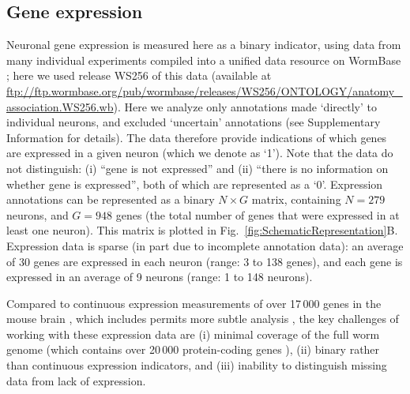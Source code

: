 \documentclass[10pt,letterpaper]{article}
\begin{document}
\subsection*{Gene expression}
Neuronal gene expression is measured here as a binary indicator, using data from many individual experiments compiled into a unified data resource on WormBase \cite{Harris:2009kd}; here we used release WS256 of this data (available at \url{ftp://ftp.wormbase.org/pub/wormbase/releases/WS256/ONTOLOGY/anatomy_association.WS256.wb}).
Here we analyze only annotations made `directly' to individual neurons, and excluded `uncertain' annotations (see Supplementary Information for details).
The data therefore provide indications of which genes are expressed in a given neuron (which we denote as `1').
Note that the data do not distinguish: (i) ``gene is not expressed'' and (ii) ``there is no information on whether gene is expressed'', both of which are represented as a `0'.
Expression annotations can be represented as a binary $N \times G$ matrix, containing $N=279$ neurons, and $G = 948$ genes (the total number of genes that were expressed in at least one neuron).
This matrix is plotted in Fig.~\ref{fig:SchematicRepresentation}B.
Expression data is sparse (in part due to incomplete annotation data): an average of 30 genes are expressed in each neuron (range: 3 to 138 genes), and each gene is expressed in an average of 9 neurons (range: 1 to 148 neurons).

Compared to continuous expression measurements of over 17\,000 genes in the mouse brain \cite{Lein:2007jn}, which includes permits more subtle analysis \cite{Fulcher:2016ck, Ji:2014jw, Fakhry:2015kl, French2011}, the key challenges of working with these expression data are (i) minimal coverage of the full worm genome (which contains over 20\,000 protein-coding genes \cite{Harris:2009kd}), (ii) binary rather than continuous expression indicators, and (iii) inability to distinguish missing data from lack of expression.

\end{document}

